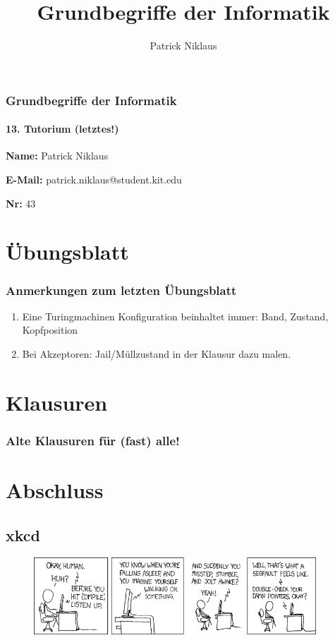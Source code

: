 \documentclass{beamer}
\title{Grundbegriffe der Informatik}
\author{Patrick Niklaus}
\begin{document}
\begin{frame}
  \frametitle{Grundbegriffe der Informatik}
  \framesubtitle{13. Tutorium (letztes!)}
  \begin{description}
    \item \textbf{Name:} Patrick Niklaus
    \item \textbf{E-Mail:} patrick.niklaus@student.kit.edu
    \item \textbf{Nr:} 43
  \end{description}
\end{frame}

\section{Übungsblatt}
\begin{frame}
  \frametitle{Anmerkungen zum letzten Übungsblatt}
  \begin{enumerate}
    \item Eine Turingmachinen Konfiguration beinhaltet immer: Band, Zustand, Kopfposition
    \item Bei Akzeptoren: Jail/Müllzustand in der Klausur dazu malen.
  \end{enumerate}
\end{frame}

\section{Klausuren}
\begin{frame}
  \frametitle{Alte Klausuren für (fast) alle!}
\end{frame}

\section{Abschluss}
\subsection{xkcd}
\begin{frame}[plain]
  \begin{figure}
    \begin{center}
      \includegraphics[width=300pt]{compiler_complaint}
    \end{center}
  \end{figure}
\end{frame}
\end{document}
